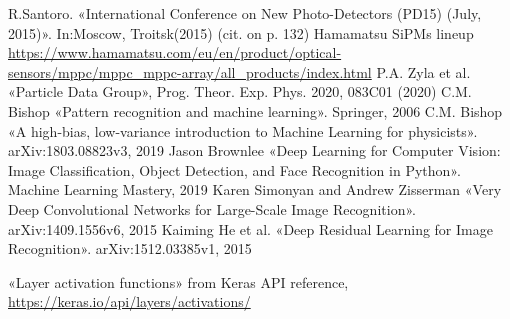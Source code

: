 \documentclass[a4paper,11pt,titlepage,oneside,openright]{book}	%
\begin{document}
\begin{backmatter}
\begin{thebibliography}{99}
			 R.Santoro. «International Conference on New Photo-Detectors (PD15) (July, 2015)». In:Moscow, Troitsk(2015) (cit. on p. 132)
			 Hamamatsu SiPMs lineup\\ \url{https://www.hamamatsu.com/eu/en/product/optical-sensors/mppc/mppc_mppc-array/all_products/index.html}
			 P.A. Zyla et al. «Particle Data Group», Prog. Theor. Exp. Phys. 2020, 083C01 (2020)
			 C.M. Bishop «Pattern recognition and machine learning». Springer, 2006
			 C.M. Bishop «A high-bias, low-variance introduction to Machine Learning for physicists». arXiv:1803.08823v3, 2019
			 Jason Brownlee «Deep Learning for Computer Vision: Image Classification, Object Detection, and Face Recognition in Python». Machine Learning Mastery, 2019
			 Karen Simonyan and Andrew Zisserman «Very Deep Convolutional Networks for Large-Scale Image Recognition». arXiv:1409.1556v6, 2015
			 Kaiming He et al. «Deep Residual Learning for Image Recognition». arXiv:1512.03385v1, 2015
			
			 «Layer activation functions» from Keras API reference,\\ \url{https://keras.io/api/layers/activations/}
		\end{thebibliography}
		
	\end{backmatter}
	
	
\end{document}
